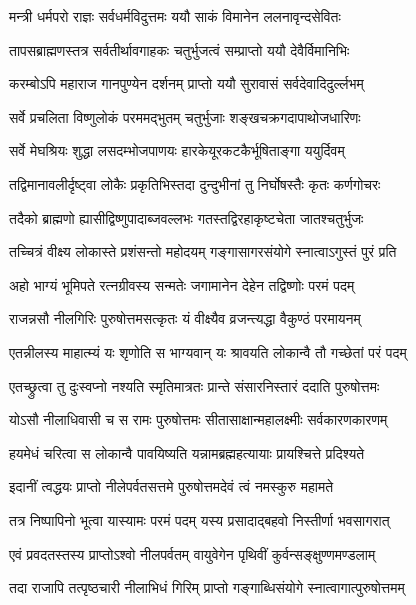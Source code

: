 \twolineshloka
{मन्त्री धर्मपरो राज्ञः सर्वधर्मविदुत्तमः}
{ययौ साकं विमानेन ललनावृन्दसेवितः}%

\twolineshloka
{तापसब्राह्मणस्तत्र सर्वतीर्थावगाहकः}
{चतुर्भुजत्वं सम्प्राप्तो ययौ देवैर्विमानिभिः}%

\twolineshloka
{करम्बोऽपि महाराज गानपुण्येन दर्शनम्}
{प्राप्तो ययौ सुरावासं सर्वदेवादिदुर्ल्लभम्}%

\twolineshloka
{सर्वे प्रचलिता विष्णुलोकं परममद्भुतम्}
{चतुर्भुजाः शङ्खचक्रगदापाथोजधारिणः}%

\twolineshloka
{सर्वे मेघश्रियः शुद्धा लसदम्भोजपाणयः}
{हारकेयूरकटकैर्भूषिताङ्गा ययुर्दिवम्}%

\twolineshloka
{तद्विमानावलीर्दृष्ट्वा लोकैः प्रकृतिभिस्तदा}
{दुन्दुभीनां तु निर्घोषस्तैः कृतः कर्णगोचरः}%

\twolineshloka
{तदैको ब्राह्मणो ह्यासीद्विष्णुपादाब्जवल्लभः}
{गतस्तद्विरहाकृष्टचेता जातश्चतुर्भुजः}%

\twolineshloka
{तच्चित्रं वीक्ष्य लोकास्ते प्रशंसन्तो महोदयम्}
{गङ्गासागरसंयोगे स्नात्वाऽगुस्तं पुरं प्रति}%

\twolineshloka
{अहो भाग्यं भूमिपते रत्नग्रीवस्य सन्मतेः}
{जगामानेन देहेन तद्विष्णोः परमं पदम्}%

\twolineshloka
{राजन्नसौ नीलगिरिः पुरुषोत्तमसत्कृतः}
{यं वीक्ष्यैव व्रजन्त्यद्धा वैकुण्ठं परमायनम्}%

\twolineshloka
{एतन्नीलस्य माहात्म्यं यः शृणोति स भाग्यवान्}
{यः श्रावयति लोकान्वै तौ गच्छेतां परं पदम्}%

\twolineshloka
{एतच्छ्रुत्वा तु दुःस्वप्नो नश्यति स्मृतिमात्रतः}
{प्रान्ते संसारनिस्तारं ददाति पुरुषोत्तमः}%

\twolineshloka
{योऽसौ नीलाधिवासी च स रामः पुरुषोत्तमः}
{सीतासाक्षान्महालक्ष्मीः सर्वकारणकारणम्}%

\twolineshloka
{हयमेधं चरित्वा स लोकान्वै पावयिष्यति}
{यन्नामब्रह्महत्यायाः प्रायश्चित्ते प्रदिश्यते}%

\twolineshloka
{इदानीं त्वद्धयः प्राप्तो नीलेपर्वतसत्तमे}
{पुरुषोत्तमदेवं त्वं नमस्कुरु महामते}%

\twolineshloka
{तत्र निष्पापिनो भूत्वा यास्यामः परमं पदम्}
{यस्य प्रसादाद्बहवो निस्तीर्णा भवसागरात्}%

\twolineshloka
{एवं प्रवदतस्तस्य प्राप्तोऽश्वो नीलपर्वतम्}
{वायुवेगेन पृथिवीं कुर्वन्सङ्क्षुण्णमण्डलाम्}%

\twolineshloka
{तदा राजापि तत्पृष्ठचारी नीलाभिधं गिरिम्}
{प्राप्तो गङ्गाब्धिसंयोगे स्नात्वागात्पुरुषोत्तमम्}%


